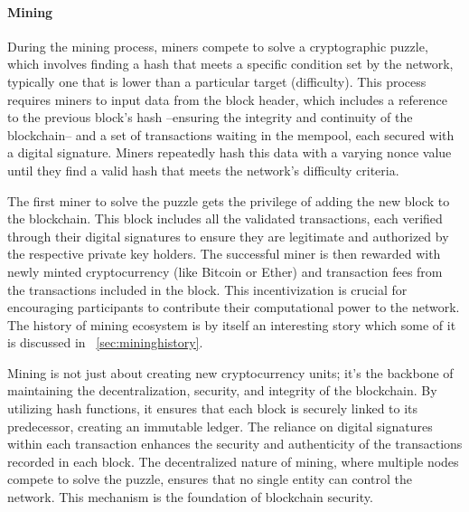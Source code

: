 \paragraph{Mining}
During the mining process, miners compete to solve a cryptographic puzzle, which involves finding a hash that meets a specific condition set by the network, typically one that is lower than a particular target (difficulty). This process requires miners to input data from the block header, which includes a reference to the previous block's hash --ensuring the integrity and continuity of the blockchain-- and a set of transactions waiting in the mempool, each secured with a digital signature. Miners repeatedly hash this data with a varying nonce value until they find a valid hash that meets the network's difficulty criteria.


The first miner to solve the puzzle gets the privilege of adding the new block to the blockchain. This block includes all the validated transactions, each verified through their digital signatures to ensure they are legitimate and authorized by the respective private key holders. The successful miner is then rewarded with newly minted cryptocurrency (like Bitcoin or Ether) and transaction fees from the transactions included in the block. This incentivization is crucial for encouraging participants to contribute their computational power to the network. The history of mining ecosystem is by itself an interesting story which some of it is discussed in ~\ref{sec:mininghistory}.

Mining is not just about creating new cryptocurrency units; it's the backbone of maintaining the decentralization, security, and integrity of the blockchain. By utilizing hash functions, it ensures that each block is securely linked to its predecessor, creating an immutable ledger. The reliance on digital signatures within each transaction enhances the security and authenticity of the transactions recorded in each block. The decentralized nature of mining, where multiple nodes compete to solve the puzzle, ensures that no single entity can control the network. This mechanism is the foundation of blockchain security.


